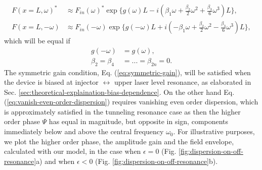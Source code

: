 \documentclass[]{spie}  %
\begin{document}
\begin{appendices}
\begin{subequations}
\begin{align}
		F(x=L,\omega)^* &\approx F_{in}(\omega)^* \exp\{g(\omega)L-i(\beta_1\omega + \frac{\beta_2}{2}\omega^2 + \frac{\beta_3}{6}\omega^3 )L\}, \\
		F(x=L,-\omega) &\approx F_{in}(-\omega) \exp\{g(-\omega)L+i(-\beta_1\omega + \frac{\beta_2}{2}\omega^2 - \frac{\beta_3}{6}\omega^3 )L\},
	\end{align}
\end{subequations}
which will be equal if
\begin{subequations}
	\begin{align}
	g(-\omega) &= g(\omega), \label{eq:symmetric-gain}\\
	\beta_2 = \beta_4 &= ... = \beta_{2n}=0. \label{eq:vanish-even-order-dispersion}
	\end{align}
\end{subequations}
The symmetric gain condition, Eq. (\ref{eq:symmetric-gain}), will be satisfied when the device is biased at injector $\leftrightarrow$ upper laser level resonance, as elaborated in Sec. \ref{sec:theoretical-explaination-bias-dependence}. On the other hand Eq. (\ref{eq:vanish-even-order-dispersion}) requires vanishing even order dispersion, which is approximately satisfied in the tunneling resonance case as then the higher order phase $\Psi$ has equal in magnitude, but opposite in sign, components immediately below and above the central frequency $\omega_0$. For illustrative purposes, we plot the higher order phase, the amplitude gain and the field envelope, calculated with our model, in the case when $\epsilon = 0$ (Fig. \ref{fig:dispersion-on-off-resonance}a) and when $\epsilon < 0$ (Fig. \ref{fig:dispersion-on-off-resonance}b). 


\end{appendices}
\end{document}

